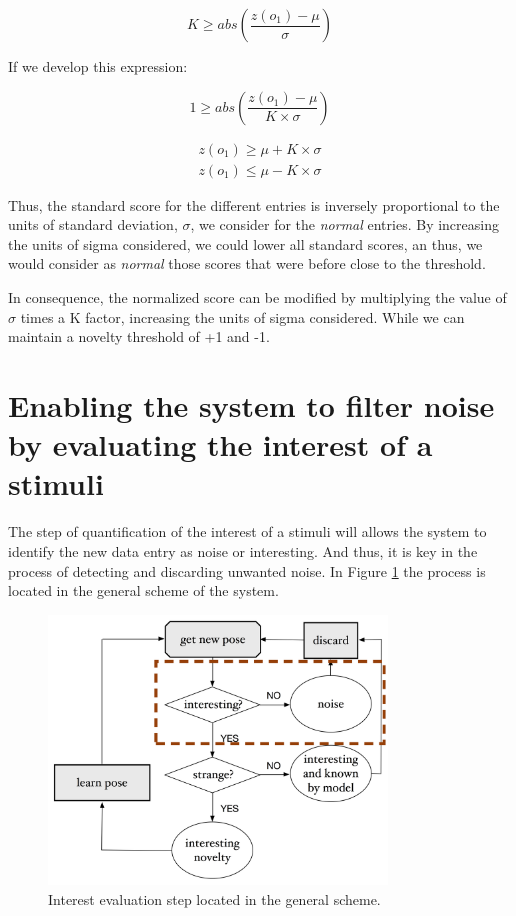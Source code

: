 \begin{equation}
K \geq abs( \dfrac{z(o_1) - \mu}{ \sigma} )
\end{equation}

If we develop this expression:

\begin{equation}
1 \geq abs( \dfrac{z(o_1) - \mu}{ K \times \sigma} )
\end{equation}

\begin{equation}
\begin{split}
z(o_1) \geq \mu + K \times \sigma \\
z(o_1) \leq \mu - K \times \sigma
\end{split}
\end{equation}

Thus, the standard score for the different entries is inversely proportional to the units of standard deviation, $\sigma$, we consider for the \emph{normal} entries. By increasing the units of sigma considered, we could lower all standard scores, an thus, we would consider as \emph{normal} those scores that were before close to the threshold. 

In consequence, the normalized score can be modified by multiplying the value of $\sigma$ times a K factor, increasing the units of sigma considered. While we can maintain a novelty threshold of +1 and -1.


\section{Enabling the system to filter noise by evaluating the interest of a stimuli} \label{3.2}

The step of quantification of the interest of a stimuli will allows the system to identify the new data entry as noise or interesting. And thus, it is key in the process of detecting and discarding unwanted noise. In Figure \ref{fig:sche_interest} the process is located in the general scheme of the system. 

\begin{figure}[h]
\includegraphics[width=9cm]{Figures/Esquema_interest}
\centering
\caption{Interest evaluation step located in the general scheme. \label{fig:sche_interest}}
\end{figure}

